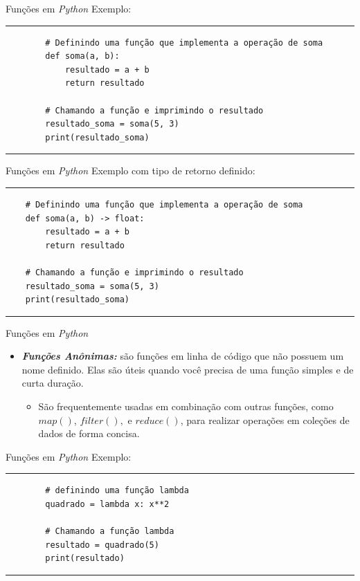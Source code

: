 \documentclass{beamer}
\begin{document}
\begin{frame}[fragile]{Funções em \textit{Python}}
	\label{estruturas_de_funcoes_exemplo}
	Exemplo:
	\rule{\textwidth}{1pt}
	\scriptsize
	\begin{verbatim}
		# Definindo uma função que implementa a operação de soma
		def soma(a, b):
			resultado = a + b
			return resultado
		
		# Chamando a função e imprimindo o resultado
		resultado_soma = soma(5, 3)
		print(resultado_soma)
			\end{verbatim}
	\rule{\textwidth}{1pt}
\end{frame}

\begin{frame}[fragile]{Funções em \textit{Python}}
	\label{estruturas_de_funcoes_outro_exemplo}
Exemplo com tipo de retorno definido:
\rule{\textwidth}{1pt}
\scriptsize
\begin{verbatim}
	# Definindo uma função que implementa a operação de soma
	def soma(a, b) -> float:
		resultado = a + b
		return resultado
	
	# Chamando a função e imprimindo o resultado
	resultado_soma = soma(5, 3)
	print(resultado_soma)
\end{verbatim}
\rule{\textwidth}{1pt}
\end{frame}


\begin{frame}{Funções em \textit{Python}}
	\label{funcoes_anonimas}
	\begin{itemize}
		\item \textbf{\textit{Funções Anônimas:}} são funções em linha de código que não possuem um nome definido. Elas são úteis quando você precisa de uma função simples e de curta duração.
		\begin{itemize}
			\item São frequentemente usadas em combinação com outras funções, como $map()$, $filter(),$ e $reduce()$, para realizar operações em coleções de dados de forma concisa.
		\end{itemize}
	\end{itemize}
\end{frame}

\begin{frame}[fragile]{Funções em \textit{Python}}
	\label{funcoes_anonimas_exemplo}
	Exemplo:
	\rule{\textwidth}{1pt}
	\scriptsize
	\begin{verbatim}
		# definindo uma função lambda
		quadrado = lambda x: x**2
		
		# Chamando a função lambda
		resultado = quadrado(5)
		print(resultado)
	\end{verbatim}
	\rule{\textwidth}{1pt}
\end{frame}
\end{document}
